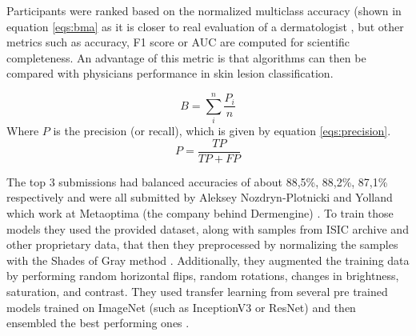     Participants were ranked based on the normalized multiclass accuracy (shown in equation \ref{eqs:bma} as it is closer to real evaluation of a dermatologist \cite{isic2018}, but other metrics such as accuracy, F1 score or AUC are computed for scientific completeness. An advantage of this metric is that algorithms can then be compared with physicians performance in skin lesion classification. \par 
    \begin{equation} 
        B=\sum_{i}^{n} \frac{P_i}{n} 
        \label{eqs:bma}    
    \end{equation}
    Where $P$ is the precision (or recall), which is given by equation \ref{eqs:precision}.
    \begin{equation}
        P=\frac{TP}{TP+FP} 
        \label{eqs:precision}    
    \end{equation}
    
    The top 3 submissions had balanced accuracies of about 88,5\%, 88,2\%, 87,1\% respectively and were all submitted by Aleksey Nozdryn-Plotnicki and Yolland which work at Metaoptima (the company behind Dermengine) \cite{isic2018top3}. To train those models they used the provided dataset, along with samples from ISIC archive and other proprietary data, that then they preprocessed by normalizing the samples with the Shades of Gray method \cite{shadesgray}. Additionally, they augmented the training data by performing random horizontal flips, random rotations, changes in brightness, saturation, and contrast. They used transfer learning from several pre trained models trained on ImageNet (such as InceptionV3 or ResNet) and then ensembled the best performing ones \cite{isic2018top3}. \par
    
